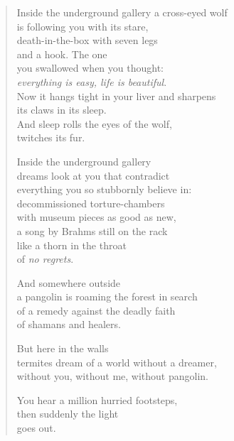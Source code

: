 \clearpage


\begin{verse}

Inside the underground gallery a cross-eyed wolf\\
is following you with its stare,\\
death-in-the-box with seven legs\\
and a hook. The one\\
you swallowed when you thought:\\
\emph{everything is easy, life is beautiful}.\\
Now it hangs tight in your liver and sharpens\\
its claws in its sleep.\\
And sleep rolls the eyes of the wolf,\\
twitches its fur.

Inside the underground gallery\\
dreams look at you that contradict\\
everything you so stubbornly believe in:\\
decommissioned torture-chambers\\
with museum pieces as good as new,\\
a song by Brahms still on the rack\\
like a thorn in the throat\\
of \emph{no regrets}.

And somewhere outside\\
a pangolin is roaming the forest in search\\
of a remedy against the deadly faith\\
of shamans and healers.

\clearpage

But here in the walls\\
termites dream of a world without a dreamer,\\
without you, without me, without pangolin.

You hear a million hurried footsteps,\\
then suddenly the light\\
goes out.

\end{verse}
